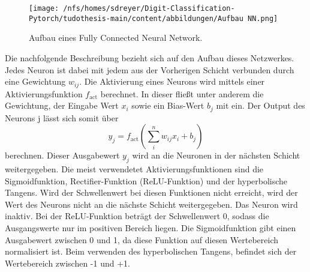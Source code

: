 \begin{figure}[htbp]
  \centering
  \texttt{[image: /nfs/homes/sdreyer/Digit-Classification-Pytorch/tudothesis-main/content/abbildungen/Aufbau NN.png]}
  \caption{Aufbau eines Fully Connected Neural Network.~\cite{lecun2015deep}}
  \label{fig:NN}
\end{figure}
Die nachfolgende Beschreibung bezieht sich auf den Aufbau dieses Netzwerkes.
Jedes Neuron ist dabei mit jedem aus der Vorherigen Schicht verbunden durch eine Gewichtung $w_{ij}$.
Die Aktivierung eines Neurons wird mittels einer Aktivierungsfunktion $f_\text{act}$ berechnet. In dieser fließt unter anderem die Gewichtung, 
der Eingabe Wert $x_i$ sowie ein Bias-Wert $b_j$ mit ein.
Der Output des Neurons j lässt sich somit über 
\begin{equation}
    y_j = f_\text{act}\left(\sum_{i}^{n} w_{ij}x_i + b_j\right)
\end{equation}
berechnen.
Dieser Ausgabewert $y_j$ wird an die Neuronen in der nächsten Schicht weitergegeben.
Die meist verwendetet Aktivierungsfunktionen sind die Sigmoidfunktion, Rectifier-Funktion (ReLU-Funktion) und der hyperbolische Tangens.
Wird der Schwellenwert bei diesen Funktionen nicht erreicht, wird der Wert des Neurons nicht an die nächste Schicht weitergegeben.
Das Neuron wird inaktiv.
Bei der ReLU-Funktion beträgt der Schwellenwert  0, sodass die Ausgangswerte nur im positiven Bereich liegen.
Die Sigmoidfunktion gibt einen Ausgabewert zwischen 0 und 1, da diese Funktion auf diesen Wertebereich normalisiert ist.
Beim verwenden des hyperbolischen Tangens, befindet sich der Wertebereich zwischen -1 und +1.~\cite{datascience}

